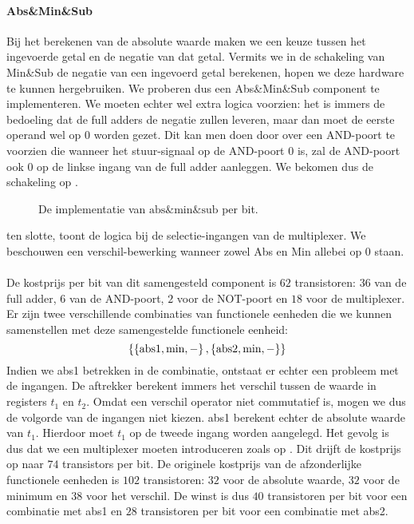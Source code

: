 \paragraph{Abs\&Min\&Sub}
Bij het berekenen van de absolute waarde maken we een keuze tussen het ingevoerde getal en de negatie van dat getal. Vermits we in de schakeling van \mbox{Min\&Sub} de negatie van een ingevoerd getal berekenen, hopen we deze hardware te kunnen hergebruiken. We proberen dus een \mbox{Abs\&Min\&Sub} component te implementeren. We moeten echter wel extra logica voorzien: het is immers de bedoeling dat de full adders de negatie zullen leveren, maar dan moet de eerste operand wel op $0$ worden gezet. Dit kan men doen door over een AND-poort te voorzien die wanneer het stuur-signaal op de AND-poort $0$ is, zal de AND-poort ook $0$ op de linkse ingang van de full adder aanleggen. We bekomen dus de schakeling op .
\begin{figure}[hbt]
\centering
{}
\caption{De implementatie van $\mbox{abs\&min\&sub}$ per bit.}
\end{figure}
 ten slotte, toont de logica bij de selectie-ingangen van de multiplexer. We beschouwen een verschil-bewerking wanneer zowel \mbox{Abs} en \mbox{Min} allebei op $0$ staan.
\paragraph{}
De kostprijs per bit van dit samengesteld component is $62$ transistoren: $36$ van de full adder, $6$ van de AND-poort, $2$ voor de NOT-poort en $18$ voor de multiplexer. Er zijn twee verschillende combinaties van functionele eenheden die we kunnen samenstellen met deze samengestelde functionele eenheid:
\begin{equation}
\left\{ \left\{ \mbox{abs1},\mbox{min},- \right\},\left\{ \mbox{abs2},\mbox{min},- \right\} \right\}
\end{equation}
Indien we \mbox{abs1} betrekken in de combinatie, ontstaat er echter een probleem met de ingangen. De aftrekker berekent immers het verschil tussen de waarde in registers $t_1$ en $t_2$. Omdat een verschil operator niet commutatief is, mogen we dus de volgorde van de ingangen niet kiezen. \mbox{abs1} berekent echter de absolute waarde van $t_1$. Hierdoor moet $t_1$ op de tweede ingang worden aangelegd. Het gevolg is dus dat we een multiplexer moeten introduceren zoals op . Dit drijft de kostprijs op naar $74$ transistors per bit. De originele kostprijs van de afzonderlijke functionele eenheden is $102$ transistoren: $32$ voor de absolute waarde, $32$ voor de minimum en $38$ voor het verschil. De winst is dus $40$ transistoren per bit voor een combinatie met \mbox{abs1} en $28$ transistoren per bit voor een combinatie met \mbox{abs2}.
